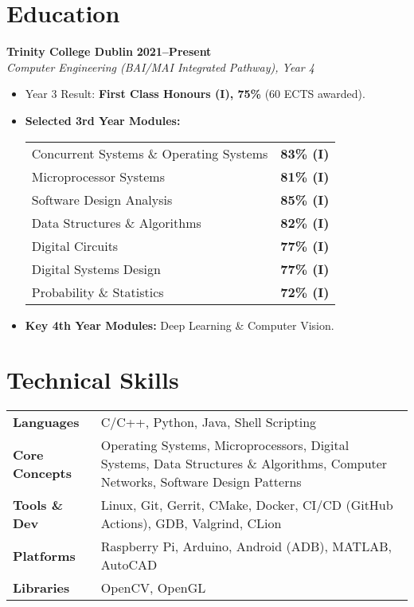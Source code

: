 \documentclass[10pt,a4paper]{article}
\begin{document}
\section*{Education}
\textbf{Trinity College Dublin} \hfill \textbf{2021--Present} \\
\textit{Computer Engineering (BAI/MAI Integrated Pathway), Year 4}
\begin{itemize}
    \item Year 3 Result: \textbf{First Class Honours (I), 75\%} (60 ECTS awarded).
    \item \textbf{Selected 3rd Year Modules:} \\
        \begin{tabularx}{\linewidth}{@{} X r @{}}
            Concurrent Systems \& Operating Systems & \textbf{83\% (I)} \\
            Microprocessor Systems & \textbf{81\% (I)} \\
            Software Design Analysis & \textbf{85\% (I)} \\
            Data Structures \& Algorithms & \textbf{82\% (I)} \\
            Digital Circuits & \textbf{77\% (I)} \\
            Digital Systems Design & \textbf{77\% (I)} \\
            Probability \& Statistics & \textbf{72\% (I)} \\
        \end{tabularx}
    \item \textbf{Key 4th Year Modules:} Deep Learning \& Computer Vision.
\end{itemize}


\section*{Technical Skills}
\begin{tabularx}{\textwidth}{@{} l >{\raggedright\arraybackslash}X @{}}
    \textbf{Languages}      & C/C++, Python, Java, Shell Scripting \\
    \textbf{Core Concepts}  & Operating Systems, Microprocessors, Digital Systems, Data Structures \& Algorithms, Computer Networks, Software Design Patterns \\
    \textbf{Tools \& Dev}   & Linux, Git, Gerrit, CMake, Docker, CI/CD (GitHub Actions), GDB, Valgrind, CLion \\
    \textbf{Platforms}      & Raspberry Pi, Arduino, Android (ADB), MATLAB, AutoCAD \\
    \textbf{Libraries}      & OpenCV, OpenGL \\
\end{tabularx}
\end{document}

